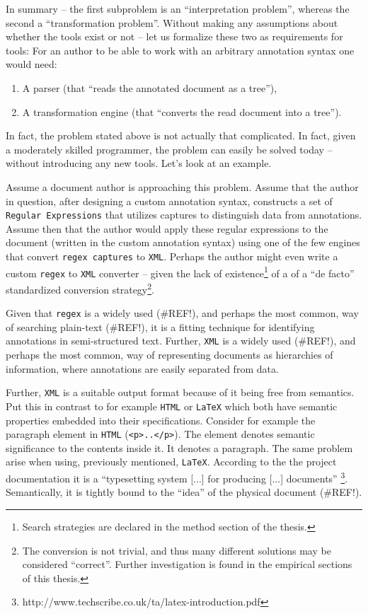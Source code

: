 \documentclass{scrreprt}
\begin{document}
In summary -- the first subproblem is an ``interpretation problem'', whereas the second a ``transformation problem''. Without making any assumptions about whether the tools exist or not -- let us formalize these two as requirements for tools: For an author to be able to work with an arbitrary annotation syntax one would need:

\begin{enumerate}
\item A parser (that ``reads the annotated document as a tree''),
\item A transformation engine (that ``converts the read document into a tree'').
\end{enumerate}

In fact, the problem stated above is not actually that complicated. In fact, given a moderately skilled programmer, the problem can easily be solved today -- without introducing any new tools. Let's look at an example.

Assume a document author is approaching this problem. Assume that the author in question, after designing a custom annotation syntax, constructs a set of \texttt{Regular Expressions} that utilizes captures to distinguish data from annotations. Assume then that the author would apply these regular expressions to the document (written in the custom annotation syntax)  using one of the few engines that convert \texttt{regex captures} to \texttt{XML}. Perhaps the author might even write a custom \texttt{regex} to \texttt{XML} converter -- given the lack of existence\footnote{ Search strategies are declared in the method section of the thesis.} of a of a ``de facto'' standardized conversion strategy\footnote{ The conversion is not trivial, and thus many different solutions may be considered ``correct''. Further investigation is found in the empirical sections of this thesis.}.

Given that \texttt{regex} is a widely used (\#REF!), and perhaps the most common, way of searching plain-text (\#REF!), it is a fitting technique for identifying annotations in semi-structured text. Further, \texttt{XML} is a widely used (\#REF!), and perhaps the most common, way of representing documents as hierarchies of information, where annotations are easily separated from data.

Further, \texttt{XML} is a suitable output format because of it being free from semantics. Put this in contrast to for example \texttt{HTML} or \texttt{LaTeX} which both have semantic properties embedded into their specifications. Consider for example the paragraph element in \texttt{HTML} (\texttt{<p>..</p>}). The element denotes semantic significance to the contents inside it. It denotes a paragraph. The same problem arise when using, previously mentioned, \texttt{LaTeX}. According to the the project documentation it is a ``typesetting system [...] for producing [...] documents'' \footnote{ http://www.techscribe.co.uk/ta/latex-introduction.pdf}. Semantically, it is tightly bound to the ``idea'' of the physical document (\#REF!). 
\end{document}
